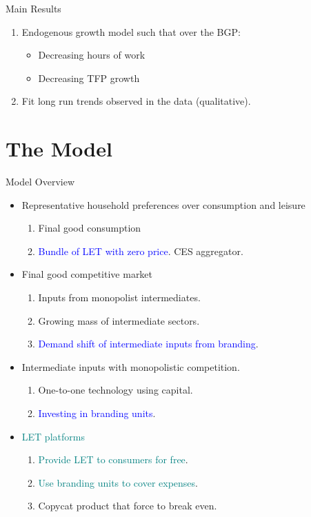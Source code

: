 \documentclass[usenames,dvipsnames]{beamer}
\begin{document}
\begin{frame}{Main Results}
\begin{enumerate}
    \item Endogenous growth model such that over the BGP:
    \begin{itemize}
        \item Decreasing hours of work
        \item Decreasing TFP growth 
    \end{itemize}
    \item Fit long run trends observed in the data (qualitative).  
\end{enumerate}
    
\end{frame}

\section{The Model}

\begin{frame}{Model Overview}
\begin{itemize}
    \item Representative household preferences over consumption and leisure
    \begin{enumerate}
        \item Final good consumption
        \item \textcolor{blue}{Bundle of LET with zero price}. CES aggregator. 
    \end{enumerate}
    \item Final good competitive market
    \begin{enumerate}
        \item Inputs from monopolist intermediates. 
        \item Growing mass of intermediate sectors. 
        \item \textcolor{blue}{Demand shift of intermediate inputs from branding}. 
    \end{enumerate}
    \item Intermediate inputs with monopolistic competition. 
    \begin{enumerate}
        \item One-to-one technology using capital. 
        \item \textcolor{blue}{Investing in branding units}.
    \end{enumerate}
    \pause 
    \item \textcolor{teal}{LET platforms}
    \begin{enumerate}
        \item \textcolor{teal}{Provide LET to consumers for free}.
        \item \textcolor{teal}{Use branding units to cover expenses}.
        \item Copycat product that force to break even. 
    \end{enumerate}
\end{itemize}
    
\end{frame}
\end{document}
